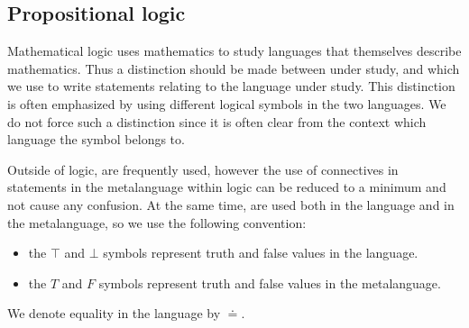 \subsection{Propositional logic}\label{subsec:propositional_logic}

\begin{remark}\label{remark:metalanguage}
  Mathematical logic uses mathematics to study languages that themselves describe mathematics. Thus a distinction should be made between  under study, and  which we use to write statements relating to the language under study. This distinction is often emphasized by using different logical symbols in the two languages. We do not force such a distinction since it is often clear from the context which language the symbol belongs to.

  Outside of logic,  are frequently used, however the use of connectives in statements in the metalanguage within logic can be reduced to a minimum and not cause any confusion. At the same time,  are used both in the language and in the metalanguage, so we use the following convention:
  \begin{itemize}
    \item the \( \top \) and \( \bot \) symbols represent truth and false values in the language.
    \item the \( T \) and \( F \) symbols represent truth and false values in the metalanguage.
  \end{itemize}

  We denote equality in the language by \( \doteq \).
\end{remark}

